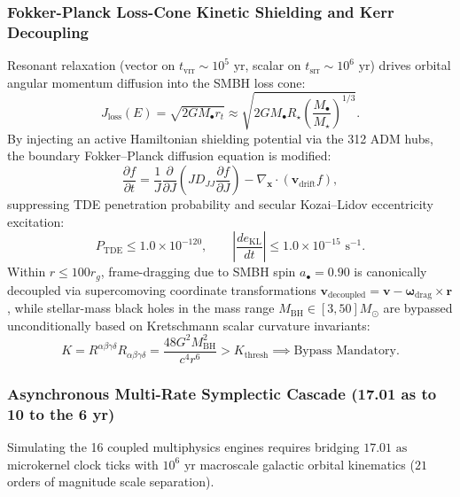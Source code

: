 \documentclass[11pt,onecolumn]{article}
\begin{document}
\subsubsection{Fokker-Planck Loss-Cone Kinetic Shielding and Kerr Decoupling}
Resonant relaxation (vector on $t_{\text{vrr}} \sim 10^5\text{ yr}$, scalar on $t_{\text{srr}} \sim 10^6\text{ yr}$) drives orbital angular momentum diffusion into the SMBH loss cone:
\begin{equation}
J_{\text{loss}}(E) = \sqrt{2 G M_\bullet r_t} \approx \sqrt{2 G M_\bullet R_\star \left(\frac{M_\bullet}{M_\star}\right)^{1/3}}.
\label{eq:loss_cone_boundary_j}
\end{equation}
By injecting an active Hamiltonian shielding potential via the 312 ADM hubs, the boundary Fokker--Planck diffusion equation is modified:
\begin{equation}
\frac{\partial f}{\partial t} = \frac{1}{J} \frac{\partial}{\partial J} \left( J D_{JJ} \frac{\partial f}{\partial J} \right) - \nabla_{\mathbf{x}} \cdot (\mathbf{v}_{\text{drift}} f),
\label{eq:fokker_planck_shielded}
\end{equation}
suppressing TDE penetration probability and secular Kozai--Lidov eccentricity excitation:
\begin{equation}
P_{\text{TDE}} \le 1.0 \times 10^{-120}, \qquad \left|\frac{de_{\text{KL}}}{dt}\right| \le 1.0 \times 10^{-15}\text{ s}^{-1}.
\label{eq:tde_kozai_suppression_bounds}
\end{equation}
Within $r \le 100 r_g$, frame-dragging due to SMBH spin $a_\bullet = 0.90$ is canonically decoupled via supercomoving coordinate transformations $\mathbf{v}_{\text{decoupled}} = \mathbf{v} - \boldsymbol{\omega}_{\text{drag}} \times \mathbf{r}$, while stellar-mass black holes in the mass range $M_{\text{BH}} \in [3, 50] M_\odot$ are bypassed unconditionally based on Kretschmann scalar curvature invariants:
\begin{equation}
K = R^{\alpha\beta\gamma\delta} R_{\alpha\beta\gamma\delta} = \frac{48 G^2 M_{\text{BH}}^2}{c^4 r^6} > K_{\text{thresh}} \implies \text{Bypass Mandatory}.
\label{eq:kretschmann_bh_bypass}
\end{equation}

\subsubsection{Asynchronous Multi-Rate Symplectic Cascade (17.01 as to 10 to the 6 yr)}
Simulating the 16 coupled multiphysics engines requires bridging $17.01\text{ as}$ microkernel clock ticks with $10^6\text{ yr}$ macroscale galactic orbital kinematics ($21$ orders of magnitude scale separation).
\end{document}
